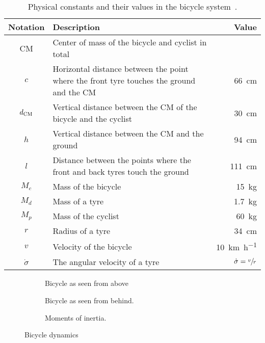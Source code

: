 \begin{table}[p]
    \centering
    \caption{Physical constants and their values in the bicycle system~\cite{randlov_learning_1998}.}
    \label{tab:bicycle_constants}
    \begin{tabularx}{\tablewidth}{cXr}
        \toprule
        Notation & Description & Value \\
        \midrule
        CM & Center of mass of the bicycle and cyclist in total & \\
        $c$ & Horizontal distance between the point where the front tyre touches the ground and the CM & \SI{66}{\cm} \\
        $d_{\text{CM}}$ & Vertical distance between the CM of the bicycle and the cyclist & \SI{30}{\cm} \\
        $h$ & Vertical distance between the CM and the ground & \SI{94}{\cm} \\
        $l$ & Distance between the points where the front and back tyres touch the ground & \SI{111}{\cm} \\
        $M_c$ & Mass of the bicycle & \SI{15}{\kg} \\
        $M_d$ & Mass of a tyre & \SI{1.7}{\kg} \\
        $M_p$ & Mass of the cyclist & \SI{60}{\kg} \\
        $r$ & Radius of a tyre & \SI{34}{\cm} \\
        $v$ & Velocity of the bicycle & \SI{10}{\km\per\hour} \\
        $\dot{\sigma}$ & The angular velocity of a tyre & $\dot{\sigma} = \sfrac{v}{r}$ \\
        \bottomrule
    \end{tabularx}
\end{table}

\begin{figure}[p]
    \centering
    \begin{subfigure}{.9\textwidth}
        \caption{Bicycle as seen from above}
        \label{fig:bicycle:above}
    \end{subfigure}
    \begin{subfigure}{.45\textwidth}
        \caption{Bicycle as seen from behind.}
        \label{fig:bicycle:behind}
    \end{subfigure}
    \begin{subfigure}{.45\textwidth}
        \caption{Moments of inertia.}
        \label{fig:bicycle:inertia}
    \end{subfigure}
    \caption{Bicycle dynamics}
    \label{fig:bicycle}
\end{figure}

